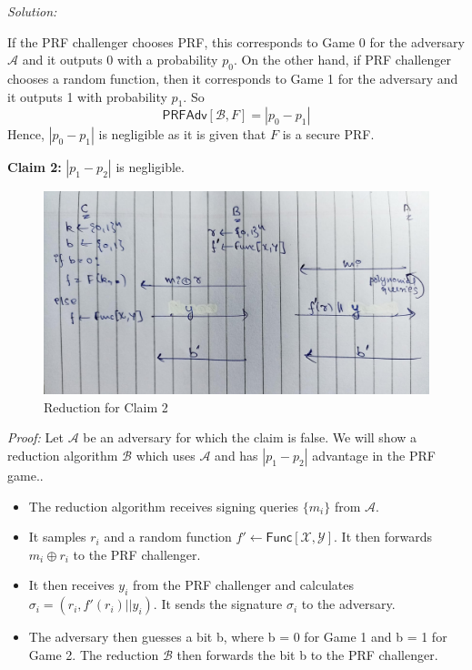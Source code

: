 \documentclass[a4paper, 11pt]{article}
\newenvironment{solution}
    {\textit{Solution:}}
    {\clearpage}
\newcommand{\prf}{\mathsf{PRFAdv}}
\newcommand{\func}{\mathsf{Func}}
\newcommand{\calA}{\mathcal{A}}
\newcommand{\calB}{\mathcal{B}}
\newcommand{\calX}{\mathcal{X}}
\newcommand{\calY}{\mathcal{Y}}
\begin{document}
\begin{solution}
\begin{enumerate}[(a)]
              If the PRF challenger chooses PRF, this corresponds to Game 0 for the adversary $\calA$ and it outputs 0 with a probability $p_0$. On the other hand, if PRF challenger chooses a random function, then it corresponds to Game 1 for the adversary and it outputs 1 with probability $p_1$. 
              So $$\prf[\calB, F] = |p_0 - p_1|$$
              Hence, $|p_0 - p_1|$ is negligible as it is given that $F$ is a secure PRF.

              \textbf{Claim 2:} $|p_1 - p_2|$ is negligible.

              \begin{figure}[!ht]
                \centering
                \includegraphics[scale=0.25]{images/Claim2.jpg}
                \caption{Reduction for Claim 2}
                \label{fig:claim2}
              \end{figure}

              \textit{Proof:} Let $\calA$ be an adversary for which the claim is false. We will show a reduction algorithm $\calB$ which uses $\calA$ and has $|p_1 - p_2|$ advantage in the PRF game..
              \begin{itemize}
                \item The reduction algorithm receives signing queries $\{m_i\}$ from $\calA$.
                \item It samples $r_i$ and a random function $f' \leftarrow \func[\calX, \calY]$. It then forwards $m_i \oplus r_i$ to the PRF challenger.
                \item It then receives $y_i$ from the PRF challenger and calculates $\sigma_i = (r_i, f'(r_i) ||y_i)$. It sends the signature $\sigma_i$ to the adversary.
                \item The adversary then guesses a bit b, where b = 0 for Game 1 and b = 1 for Game 2. The reduction $\calB$ then forwards the bit b to the PRF challenger.
              \end{itemize}


\end{enumerate}
\end{solution}
\end{document}
